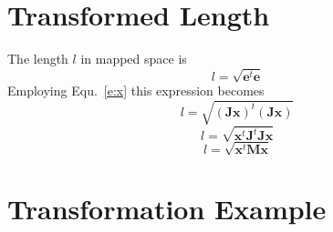 \documentclass{article}
\begin{document}
\section{Transformed Length}

The length $l$ in mapped space is
\begin{equation}
 l=\sqrt{\mathbf{e}^t\mathbf{e}}
\end{equation}
Employing Equ.~\ref{e:x} this expression becomes
\begin{equation}
 l=\sqrt{ \left( \mathbf{J}\mathbf{x}\right)^t \left( \mathbf{J}\mathbf{x} \right) }
\end{equation}
\begin{equation}
 l=\sqrt{ \mathbf{x}^t\mathbf{J}^t\mathbf{J}\mathbf{x}}
\end{equation}
\begin{equation}
 l=\sqrt{ \mathbf{x}^t\mathbf{M}\mathbf{x}}
\end{equation}

\section{Transformation Example}
\end{document}
